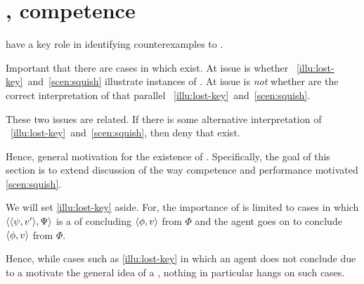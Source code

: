 \section{, competence}
\label{cha:requs:sec:add-illu}

\begin{note}
   have a key role in identifying counterexamples to \issueConstraint{}.

  Important that there are cases in which  exist.
  At issue is whether ~\ref{illu:lost-key}~and~\ref{scen:squish} illustrate instances of .
  At issue is \emph{not} whether  are the correct interpretation of  that parallel ~\ref{illu:lost-key}~and~\ref{scen:squish}.

  These two issues are related.
  If there is some alternative interpretation of ~\ref{illu:lost-key}~and~\ref{scen:squish}, then deny that  exist.

  Hence, general motivation for the existence of \requ{}.
  Specifically, the goal of this section is to extend discussion of the way competence and performance motivated \autoref{scen:squish}.

  We will set \autoref{illu:lost-key} aside.
  For, the importance of  is limited to cases in which \(\langle \langle \psi, v' \rangle, \Psi \rangle\) is a  of concluding \(\langle \phi, v \rangle\) from \(\Phi\) and the agent goes on to conclude \(\langle \phi, v \rangle\) from \(\Phi\).

  Hence, while cases such as \autoref{illu:lost-key} in which an agent does not conclude due to a \requ{} motivate the general idea of a \requ{}, nothing in particular hangs on such cases.
\end{note}

